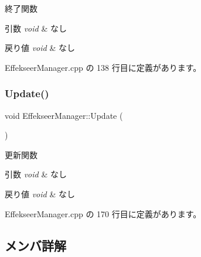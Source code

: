終了関数 


\begin{DoxyParams}{引数}
{\em void} & なし \\
\hline
\end{DoxyParams}

\begin{DoxyRetVals}{戻り値}
{\em void} & なし \\
\hline
\end{DoxyRetVals}


 Effekseer\+Manager.\+cpp の 138 行目に定義があります。

\mbox{\label{class_effekseer_manager_a2278033d786e1ada0fcaa390a613a8f9}} 
\subsubsection{\texorpdfstring{Update()}{Update()}}
{\footnotesize\ttfamily void Effekseer\+Manager\+::\+Update (\begin{DoxyParamCaption}{ }\end{DoxyParamCaption})}



更新関数 


\begin{DoxyParams}{引数}
{\em void} & なし \\
\hline
\end{DoxyParams}

\begin{DoxyRetVals}{戻り値}
{\em void} & なし \\
\hline
\end{DoxyRetVals}


 Effekseer\+Manager.\+cpp の 170 行目に定義があります。



\subsection{メンバ詳解}
\mbox{\label{class_effekseer_manager_a9a849a395605383e9c7e7850379e8b22}} 
